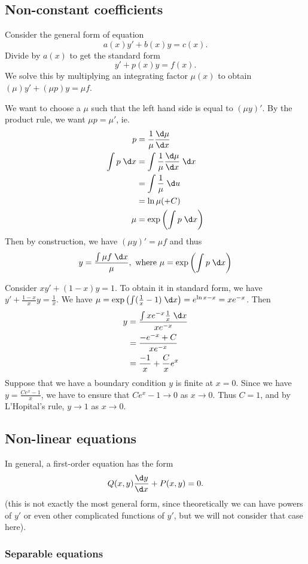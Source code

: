 \documentclass[a4paper]{article}
\begin{document}
\subsection{Non-constant coefficients}
Consider the general form of equation
\[
  a(x)y' + b(x)y = c(x).
\]
Divide by $a(x)$ to get the standard form
\[
  y' + p(x) y = f(x).
\]
We solve this by multiplying an integrating factor $\mu (x)$ to obtain $(\mu)y' + (\mu p)y = \mu f$.

We want to choose a $\mu$ such that the left hand side is equal to $(\mu y)'$. By the product rule, we want $\mu p = \mu'$, ie.
\begin{align*}
  p &= \frac{1}{\mu}\frac{\d\mu }{\d x}\\
  \int p\; \d x &= \int \frac{1}{\mu}\frac{\d \mu}{\d x} \; \d x\\
  &= \int \frac{1}{\mu}\; \d u\\
  &= \ln \mu (+ C)\\
  \mu &= \exp\left(\int p\; \d x\right)
\end{align*}
Then by construction, we have $(\mu y)' = \mu f$ and thus
\[
  y = \frac{\int \mu f\;\d x}{\mu},\text{ where } \mu = \exp\left(\int p\; \d x\right)
\]
\begin{eg}
  Consider $xy' + (1 - x)y = 1$. To obtain it in standard form, we have $y' + \frac{1 - x}{x} y = \frac{1}{x}$.
  We have $\mu = \exp\left(\int (\frac{1}{x} - 1)\; \d x\right) = e^{\ln x - x} = xe^{-x}$. Then
  \begin{align*}
    y &= \frac{\int xe^{-x}\frac{1}{x}\;\d x}{xe^{-x}}\\
    &= \frac{-e^{-x} + C}{xe^{-x}}\\
    &= \frac{-1}{x} + \frac{C}{x}e^x
  \end{align*}
  Suppose that we have a boundary condition $y$ is finite at $x = 0$. Since we have $y = \frac{Ce^x - 1}{x}$, we have to ensure that $Ce^x - 1\to 0$ as $x\to 0$. Thus $C = 1$, and by L'Hopital's rule, $y\to 1$ as $x\to 0$.
\end{eg}

\subsection{Non-linear equations}
In general, a first-order equation has the form
\[
  Q(x, y)\frac{\d y}{\d x} + P(x, y) = 0.
\]
(this is not exactly the most general form, since theoretically we can have powers of $y'$ or even other complicated functions of $y'$, but we will not consider that case here).
\subsubsection{Separable equations}
\end{document}
